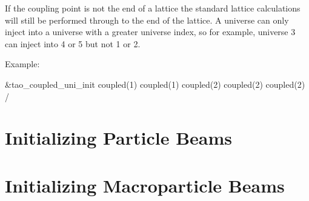 If the coupling point is not the end of a lattice the standard lattice
calculations will still be performed through to the end of the lattice.
A universe can only inject into a universe with a
greater universe index, so for example, universe 3 can inject into 4 or 5 but
not 1 or 2.

Example:
\begin{example}
  &tao_coupled_uni_init
    coupled(1)%
    coupled(1)%
    coupled(2)%
    coupled(2)%
    coupled(2)%
  /
\end{example}

\section{Initializing Particle Beams}
\label{s:beam_init}

\section{Initializing Macroparticle Beams}
\label{s:macro_init}

